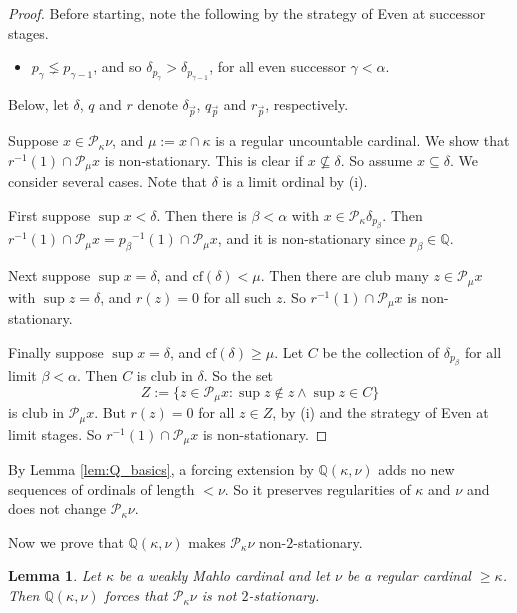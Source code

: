 \documentclass[a4paper,12pt,reqno,oneside]{amsart}
\theoremstyle{plain}
\newtheorem{lemma}[theorem]{Lemma}
\newcommand{\cof}{\mathrm{cf}}
\newcommand{\mbb}{\mathbb}
\newcommand{\mcal}{\mathcal}
\begin{document}
\begin{proof}
Before starting, note the following by the strategy of Even at successor stages.
\begin{itemize}
\item[(i)] $p_\gamma \lneq p_{\gamma -1}$, and so $\delta_{p_\gamma} > \delta_{p_{\gamma -1}}$, for all even successor $\gamma < \alpha$.
\end{itemize}
Below, let $\delta$, $q$ and $r$ denote $\delta_{\vec{p}}$, $q_{\vec{p}}$ and $r_{\vec{p}}$, respectively.

Suppose $x \in \mcal{P}_\kappa \nu$, and $\mu := x \cap \kappa$ is a regular uncountable cardinal. We show that $r^{-1} (1) \cap \mcal{P}_\mu x$ is non-stationary. This is clear if $x \not\subseteq \delta$. So assume $x \subseteq \delta$. We consider several cases. Note that $\delta$ is a limit ordinal by (i).

First suppose $\sup x < \delta$. Then there is $\beta < \alpha$ with $x \in \mcal{P}_\kappa \delta_{p_\beta}$. Then $r^{-1} (1) \cap \mcal{P}_\mu x = {p_\beta}^{-1} (1) \cap \mcal{P}_\mu x$, and it is non-stationary since $p_\beta \in \mbb{Q}$.

Next suppose $\sup x = \delta$, and $\cof ( \delta ) < \mu$. Then there are club many $z \in \mcal{P}_\mu x$ with $\sup z = \delta$, and $r(z) = 0$ for all such $z$. So $r^{-1} (1) \cap \mcal{P}_\mu x$ is non-stationary.

Finally suppose $\sup x = \delta$, and $\cof ( \delta ) \geq \mu$. Let $C$ be the collection of $\delta_{p_\beta}$ for all limit $\beta < \alpha$. Then $C$ is club in $\delta$. So the set
\[
Z := \{ z \in \mcal{P}_\mu x : \sup z \notin z \wedge \sup z \in C \}
\]
is club in $\mcal{P}_\mu x$. But $r(z) = 0$ for all $z \in Z$, by (i) and the strategy of Even at limit stages. So $r^{-1} (1) \cap \mcal{P}_\mu x$ is non-stationary.
\end{proof}

By Lemma \ref{lem:Q_basics}, a forcing extension by $\mbb{Q} ( \kappa , \nu )$ adds no new sequences of ordinals of length $< \nu$. So it preserves regularities of $\kappa$ and $\nu$ and does not change $\mcal{P}_\kappa \nu$.

Now we prove that $\mbb{Q} ( \kappa , \nu )$ makes $\mcal{P}_\kappa \nu$ non-$2$-stationary.


\begin{lemma} \label{lem:Q_2stat}
Let $\kappa$ be a weakly Mahlo cardinal and let $\nu$ be a regular cardinal $\geq \kappa$. Then $\mbb{Q} ( \kappa , \nu )$ forces that $\mcal{P}_\kappa \nu$ is not $2$-stationary.
\end{lemma}
\end{document}
